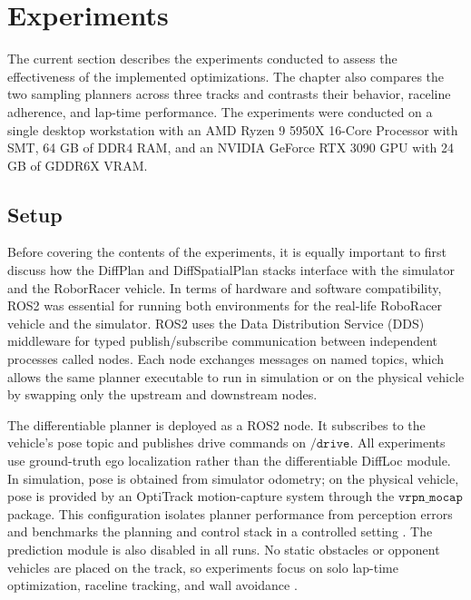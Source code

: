 \chapter{Experiments}
\label{chapter:Experiments}

The current section describes the experiments conducted to assess the effectiveness of the implemented optimizations.
The chapter also compares the two sampling planners across three tracks and contrasts their behavior, raceline adherence, and lap-time performance.
The experiments were conducted on a single desktop workstation with an AMD Ryzen 9 5950X 16-Core Processor with SMT, 64 GB of DDR4 RAM, and an NVIDIA GeForce RTX 3090 GPU with 24 GB of GDDR6X VRAM.

\section{Setup}
\label{section:Setup}

Before covering the contents of the experiments, it is equally important to first discuss how the DiffPlan and DiffSpatialPlan stacks interface with the simulator and the RoborRacer vehicle.
In terms of hardware and software compatibility, ROS2 was essential for running both environments for the real-life RoboRacer vehicle and the simulator.
ROS2 uses the Data Distribution Service (DDS) middleware for typed publish/subscribe communication between independent processes called nodes.
Each node exchanges messages on named topics, which allows the same planner executable to run in simulation or on the physical vehicle by swapping only the upstream and downstream nodes.

The differentiable planner is deployed as a ROS2 node.
It subscribes to the vehicle's pose topic and publishes drive commands on $\texttt{/drive}$.
All experiments use ground-truth ego localization rather than the differentiable DiffLoc module.
In simulation, pose is obtained from simulator odometry; on the physical vehicle, pose is provided by an OptiTrack motion-capture system through the $\texttt{vrpn\_mocap}$ package.
This configuration isolates planner performance from perception errors and benchmarks the planning and control stack in a controlled setting \cite{swadiryus_DifferentiableMotionPlanning_2025, koch_DifferentiableInterpretablePath_2025}.
The prediction module is also disabled in all runs.
No static obstacles or opponent vehicles are placed on the track, so experiments focus on solo lap-time optimization, raceline tracking, and wall avoidance \cite{koch_DifferentiableInterpretablePath_2025, swadiryus_DifferentiableMotionPlanning_2025}.

